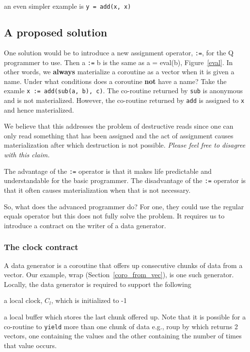 \item an even simpler example is {\tt y = add(x, x)}
\ee

\subsection{A proposed solution}

One solution would be to introduce a new assignment operator, 
\verb+:=+, for the Q programmer to use. 
Then a \verb+:=+ b is the same as a = eval(b), Figure~\ref{eval}. In other words,
we {\bf always} materialize a coroutine as a vector when it is given a name. 
Under what conditions does a coroutine {\bf not} have a name? Take the examle
{\tt x := add(sub(a, b), c)}. The co-routine returned by {\tt sub} is anonymous
and is not materialized. However, the co-routine returned by {\tt add} is
assigned to {\tt x} and hence materialized. 

We believe that this addresses the problem of destructive reads since one can
only read something that has been assigned and the act of assignment causes
materialization after which destruction is not possible. {\em Please feel free
to disagree with this claim.}


The advantage of the \verb+:=+ operator is that it makes life predictable and
understandable for the basic programmer. 
The disadvantage of the \verb+:=+ operator is that it often causes
materialization when that is not necessary. 

So, what does the advanced programmer do? For one, they could use the regular
equals operator but this does not fully solve the problem. It requires us to
introduce a contract on the writer of a data generator.

\subsubsection{The clock contract}

A data generator is a coroutine that offers up consecutive chunks of
data from a vector. Our example, wrap (Section~\ref{coro_from_vec}),
is one such generator.  Locally, the data generator is required to
support the following
\be
\item a local clock, \(C_l\), which is initialized to -1
\item a local buffer which stores the last chunk offered up. Note that it is
possible for a co-routine to {\tt yield} more than one chunk of data e.g., roup
by which returns 2 vectors, one containing the values and the other containing
the number of times that value occurs. 
\ee

